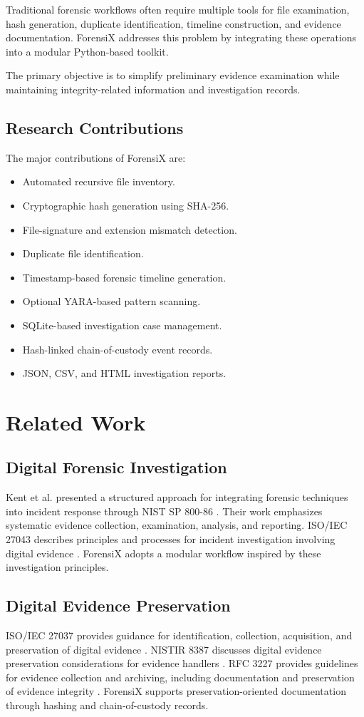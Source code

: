 \documentclass[conference]{IEEEtran}
\begin{document}
Traditional forensic workflows often require multiple tools for file examination, hash generation, duplicate identification, timeline construction, and evidence documentation. ForensiX addresses this problem by integrating these operations into a modular Python-based toolkit.

The primary objective is to simplify preliminary evidence examination while maintaining integrity-related information and investigation records.

\subsection{Research Contributions}
The major contributions of ForensiX are:
\begin{itemize}
    \item Automated recursive file inventory.
    \item Cryptographic hash generation using SHA-256.
    \item File-signature and extension mismatch detection.
    \item Duplicate file identification.
    \item Timestamp-based forensic timeline generation.
    \item Optional YARA-based pattern scanning.
    \item SQLite-based investigation case management.
    \item Hash-linked chain-of-custody event records.
    \item JSON, CSV, and HTML investigation reports.
\end{itemize}

\section{Related Work}
\subsection{Digital Forensic Investigation}
Kent et al. presented a structured approach for integrating forensic techniques into incident response through NIST SP 800-86 \cite{kent2006}. Their work emphasizes systematic evidence collection, examination, analysis, and reporting. ISO/IEC 27043 describes principles and processes for incident investigation involving digital evidence \cite{iso27043}. ForensiX adopts a modular workflow inspired by these investigation principles.

\subsection{Digital Evidence Preservation}
ISO/IEC 27037 provides guidance for identification, collection, acquisition, and preservation of digital evidence \cite{iso27037}. NISTIR 8387 discusses digital evidence preservation considerations for evidence handlers \cite{nistir8387}. RFC 3227 provides guidelines for evidence collection and archiving, including documentation and preservation of evidence integrity \cite{rfc3227}. ForensiX supports preservation-oriented documentation through hashing and chain-of-custody records.
\end{document}

